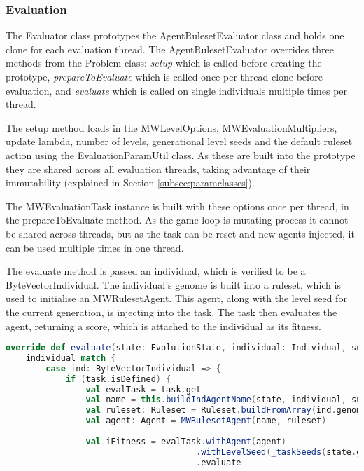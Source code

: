 \subsubsection{Evaluation}

The Evaluator class prototypes the AgentRulesetEvaluator class and holds one clone for each evaluation thread. The AgentRulesetEvaluator overrides three methods from the Problem class: \emph{setup} which is called before creating the prototype, \emph{prepareToEvaluate} which is called once per thread clone before evaluation, and \emph{evaluate} which is called on single individuals multiple times per thread.

The setup method loads in the MWLevelOptions, MWEvaluationMultipliers, update lambda, number of levels, generational level seeds and the default ruleset action using the EvaluationParamUtil class. As these are built into the prototype they are shared across all evaluation threads, taking advantage of their immutability (explained in Section \ref{subsec:paramclasses}). 

The MWEvaluationTask instance is built with these options once per thread, in the prepareToEvaluate method. As the game loop is mutating process it cannot be shared across threads, but as the task can be reset and new agents injected, it can be used multiple times in one thread.

The evaluate method is passed an individual, which is verified to be a ByteVectorIndividual. The individual's genome is built into a ruleset, which is used to initialise an MWRulesetAgent. This agent, along with the level seed for the current generation, is injecting into the task. The task then evaluates the agent, returning a score, which is attached to the individual as its fitness.


\begin{minipage}{0.9\linewidth}
\centering
\begin{lstlisting}[language=scala]
override def evaluate(state: EvolutionState, individual: Individual, subpop: Int, thread: Int): Unit = {
    individual match {
        case ind: ByteVectorIndividual => {
            if (task.isDefined) {
                val evalTask = task.get
                val name = this.buildIndAgentName(state, individual, subpop, thread)
                val ruleset: Ruleset = Ruleset.buildFromArray(ind.genome, defaultAction)
                val agent: Agent = MWRulesetAgent(name, ruleset)
            
                val iFitness = evalTask.withAgent(agent)
                                      .withLevelSeed(_taskSeeds(state.generation))
                                      .evaluate
\end{lstlisting}
\end{minipage}

